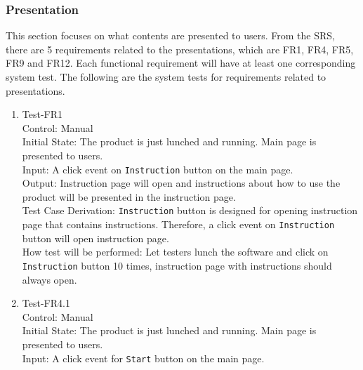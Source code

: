 \documentclass[12pt, titlepage]{article}
\begin{document}
\subsubsection{Presentation}
This section focuses on what contents are presented to users. 
From the SRS, there are 5 requirements related to the presentations, which
are FR1, FR4, FR5, FR9 and FR12. Each functional requirement will have at least one 
corresponding system test. The following are the system tests for requirements
related to presentations.

\begin{enumerate}
\item{Test-FR1\\}
Control: Manual\\ 

Initial State: The product is just lunched and running. Main page
is presented to users.\\

Input: A click event on \verb|Instruction| button on the main page.\\

Output: Instruction page will open and instructions about how to use 
the product will be presented in the instruction page.\\

Test Case Derivation: \verb|Instruction| button is designed for opening 
instruction page that contains instructions. Therefore, a click event on
\verb|Instruction| button will open instruction page.\\
					
How test will be performed: Let testers lunch the software and click on 
\verb|Instruction| button 10 times, instruction page with instructions should
always open.

\item{Test-FR4.1\\}
Control: Manual\\ 

Initial State: The product is just lunched and running. Main
page is presented to users.\\

Input: A click event for \verb|Start| button on the main page.\\


\end{enumerate}
\end{document}
